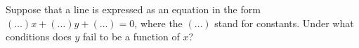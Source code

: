 Suppose that a line is expressed as an equation in the form
$(\ldots)x+(\ldots)y+(\ldots)=0$, where the $(\ldots)$ stand for
constants. Under what conditions does $y$ fail to be a function
of $x$?
